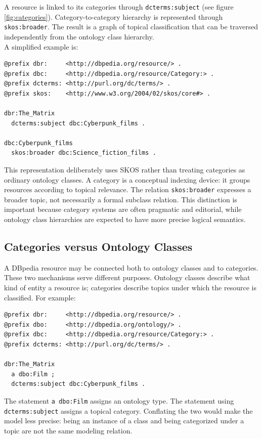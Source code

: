 \documentclass{scrbook}
\begin{document}
	A resource is linked to its categories through \texttt{dcterms:subject} (see figure \ref{fig:categories}). Category-to-category hierarchy is represented through \texttt{skos:broader}. The result is a graph of topical classification that can be traversed independently from the ontology class hierarchy.\\
	
	A simplified example is:
	
	\begin{lstlisting}
@prefix dbr:     <http://dbpedia.org/resource/> .
@prefix dbc:     <http://dbpedia.org/resource/Category:> .
@prefix dcterms: <http://purl.org/dc/terms/> .
@prefix skos:    <http://www.w3.org/2004/02/skos/core#> .
	
dbr:The_Matrix
  dcterms:subject dbc:Cyberpunk_films .
	
dbc:Cyberpunk_films
  skos:broader dbc:Science_fiction_films .
	\end{lstlisting}
	
	This representation deliberately uses SKOS rather than treating categories as ordinary ontology classes. A category is a conceptual indexing device: it groups resources according to topical relevance. The relation \texttt{skos:broader} expresses a broader topic, not necessarily a formal subclass relation. This distinction is important because category systems are often pragmatic and editorial, while ontology class hierarchies are expected to have more precise logical semantics.
	
	\subsection{Categories versus Ontology Classes}
	
	A DBpedia resource may be connected both to ontology classes and to categories. These two mechanisms serve different purposes. Ontology classes describe what kind of entity a resource is; categories describe topics under which the resource is classified. For example:
	
	\begin{lstlisting}
@prefix dbr:     <http://dbpedia.org/resource/> .
@prefix dbo:     <http://dbpedia.org/ontology/> .
@prefix dbc:     <http://dbpedia.org/resource/Category:> .
@prefix dcterms: <http://purl.org/dc/terms/> .

dbr:The_Matrix
  a dbo:Film ;
  dcterms:subject dbc:Cyberpunk_films .
	\end{lstlisting}
	
	The statement \texttt{a dbo:Film} assigns an ontology type. The statement using \texttt{dcterms:subject} assigns a topical category. Conflating the two would make the model less precise: being an instance of a class and being categorized under a topic are not the same modeling relation.
	
\end{document}

